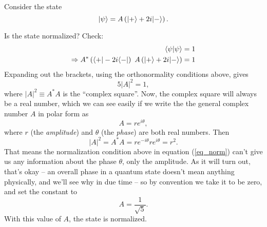 \begin{example}[Normalization]  Consider the state 
\begin{equation}
| \psi \rangle = A \left( | + \rangle + 2i | - \rangle \right).
\end{equation}

Is the state normalized?  Check:
\begin{align*}
\langle \psi | \psi \rangle &= 1 \\
\Rightarrow A^* \left( \langle + | - 2i \langle - | \right) \ A \left( | + \rangle + 2i| - \rangle \right) &=  1
\end{align*}
Expanding out the brackets, using the orthonormality conditions above, gives
\begin{equation}
\label{eq_norm}
5 |A|^2 = 1,
\end{equation}
where $|A|^2 \equiv A^* A$ is the ``complex square''.  Now, the complex square will always be a real number, which we can see easily if we write the the general complex number $A$ in polar form as
\[
A = r e^{i\theta},
\]
where $r$ (the \emph{amplitude}) and $\theta$ (the \emph{phase}) are both real numbers.  Then 
\[
|A|^2 = A^* A = re^{-i\theta} r e^{i\theta} = r^2.
\]
That means the normalization condition above in equation (\ref{eq_norm}) can't give us any information about the phase $\theta$, only the amplitude.  As it will turn out, that's okay -- an overall phase in a quantum state doesn't mean anything physically, and we'll see why in due time -- so by convention we take it to be zero, and set the constant to 
\[
A = \frac{1}{\sqrt{5}}.
\]
With this value of $A$, the state is normalized.
\end{example}

